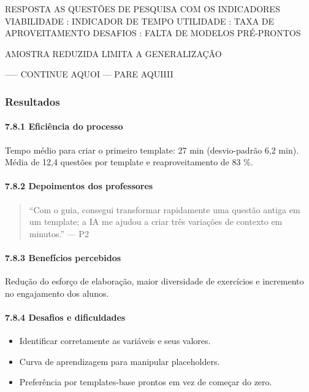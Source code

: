 RESPOSTA AS QUESTÕES DE PESQUISA COM OS INDICADORES 
VIABILIDADE : INDICADOR DE TEMPO
UTILIDADE : TAXA DE APROVEITAMENTO 
DESAFIOS : FALTA DE MODELOS PRÉ-PRONTOS

AMOSTRA REDUZIDA LIMITA A GENERALIZAÇÃO

----- CONTINUE AQUOI ---  PARE AQUIIII


\subsubsection{\textbf{Resultados}}

\paragraph{\textbf{7.8.1 Eficiência do processo}}

Tempo médio para criar o primeiro template: 27 min (desvio-padrão 6,2 min). Média de 12,4 questões por template e reaproveitamento de 83 \%.

\paragraph{\textbf{7.8.2 Depoimentos dos professores}}

\begin{quote}
“Com o guia, consegui transformar rapidamente uma questão antiga em um template; a IA me ajudou a criar três variações de contexto em minutos.” — P2

\end{quote}

\paragraph{\textbf{7.8.3 Benefícios percebidos}}

Redução do esforço de elaboração, maior diversidade de exercícios e incremento no engajamento dos alunos.

\paragraph{\textbf{7.8.4 Desafios e dificuldades}}

\begin{itemize}
    \item Identificar corretamente as variáveis e seus valores.
    \item Curva de aprendizagem para manipular placeholders.
    \item Preferência por templates-base prontos em vez de começar do zero.
\end{itemize}
 

